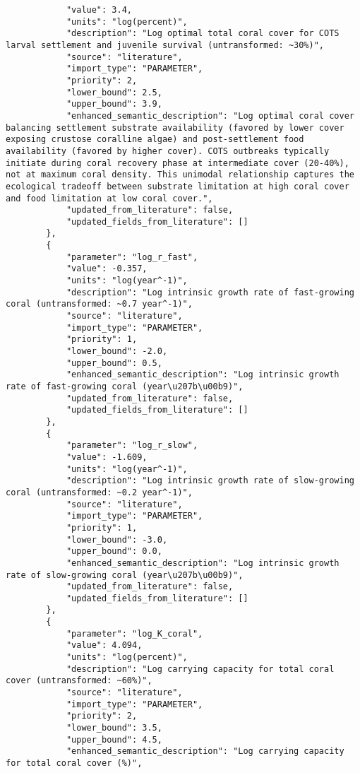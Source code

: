 \begin{lstlisting}
            "value": 3.4,
            "units": "log(percent)",
            "description": "Log optimal total coral cover for COTS larval settlement and juvenile survival (untransformed: ~30%)",
            "source": "literature",
            "import_type": "PARAMETER",
            "priority": 2,
            "lower_bound": 2.5,
            "upper_bound": 3.9,
            "enhanced_semantic_description": "Log optimal coral cover balancing settlement substrate availability (favored by lower cover exposing crustose coralline algae) and post-settlement food availability (favored by higher cover). COTS outbreaks typically initiate during coral recovery phase at intermediate cover (20-40%), not at maximum coral density. This unimodal relationship captures the ecological tradeoff between substrate limitation at high coral cover and food limitation at low coral cover.",
            "updated_from_literature": false,
            "updated_fields_from_literature": []
        },
        {
            "parameter": "log_r_fast",
            "value": -0.357,
            "units": "log(year^-1)",
            "description": "Log intrinsic growth rate of fast-growing coral (untransformed: ~0.7 year^-1)",
            "source": "literature",
            "import_type": "PARAMETER",
            "priority": 1,
            "lower_bound": -2.0,
            "upper_bound": 0.5,
            "enhanced_semantic_description": "Log intrinsic growth rate of fast-growing coral (year\u207b\u00b9)",
            "updated_from_literature": false,
            "updated_fields_from_literature": []
        },
        {
            "parameter": "log_r_slow",
            "value": -1.609,
            "units": "log(year^-1)",
            "description": "Log intrinsic growth rate of slow-growing coral (untransformed: ~0.2 year^-1)",
            "source": "literature",
            "import_type": "PARAMETER",
            "priority": 1,
            "lower_bound": -3.0,
            "upper_bound": 0.0,
            "enhanced_semantic_description": "Log intrinsic growth rate of slow-growing coral (year\u207b\u00b9)",
            "updated_from_literature": false,
            "updated_fields_from_literature": []
        },
        {
            "parameter": "log_K_coral",
            "value": 4.094,
            "units": "log(percent)",
            "description": "Log carrying capacity for total coral cover (untransformed: ~60%)",
            "source": "literature",
            "import_type": "PARAMETER",
            "priority": 2,
            "lower_bound": 3.5,
            "upper_bound": 4.5,
            "enhanced_semantic_description": "Log carrying capacity for total coral cover (%)",

\end{lstlisting}
